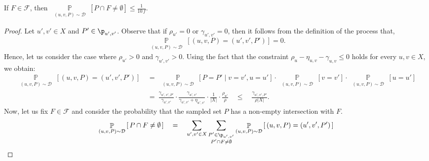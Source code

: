 \begin{lemma}\label{lem:probability_bounds_2}
    If $F\in \mathcal{F}$, then $\displaystyle \mathop{\mathbb{P}}\limits_{\substack{(u,v,P)\sim\mathcal{D}}}\left[P \cap F \neq \emptyset\right] \leq \frac{1}{10\,f}$.
\end{lemma}
\begin{proof}
    Let $u',v'\in X$ and $P'\in\p_{u',v'}$. Observe that if $\rho_{u'} = 0$ or $\gamma_{u',v'} = 0$, then it follows from the definition of the process that,
    $$
    \mathop{\mathbb{P}}\limits_{\substack{(u,v,P)\sim\mathcal{D}}}\left[(u,v,P) = (u',v',P')\right] = 0.
    $$
    Hence, let us consider the case where $\rho_{u'} > 0$ and $\gamma_{u',v'} > 0$. Using the fact that the constraint $\rho_u - \eta_{u,v} - \gamma_{u,v} \leq 0$ holds for every $u, v \in X$, we obtain:
    \begin{align*}
        \displaystyle \mathop{\mathbb{P}}\limits_{\substack{(u,v,P)\sim\mathcal{D}}}\left[(u,v,P) = (u',v',P')\right] \ 
        &= \ \displaystyle \mathop{\mathbb{P}}\limits_{\substack{(u,v,P)\sim\mathcal{D}}}\left[P = P' \mid v = v', u = u'\right] \cdot \mathop{\mathbb{P}}\limits_{\substack{(u,v,P)\sim\mathcal{D}}}\left[v = v'\right] \cdot \mathop{\mathbb{P}}\limits_{\substack{(u,v,P)\sim\mathcal{D}}}\left[u = u'\right] \\
        &= \ \frac{\gamma_{u',v',P'}}{\gamma_{u',v'}} \cdot \frac{\gamma_{u',v'}}{\gamma_{u',v'} + \eta_{u',v'}} \cdot \frac{1}{|X|} \cdot \frac{\rho_{u'}}{\rho} \quad 
        \leq \quad \frac{\gamma_{u',v',P'}}{\rho |X|}.
    \end{align*}
    Now, let us fix $F \in \mathcal{F}$ and consider the probability that the sampled set $P$ has a non-empty intersection with $F$.
    \begin{align*}
        \displaystyle \mathop{\mathbb{P}}\limits_{\substack{(u,v,P)\sim\mathcal{D}}}\left[\,P \cap F \neq \emptyset\,\right] \quad
        &= \quad \sum_{u',v'\in X} \sum_{\substack{P' \in \p_{u',v'} \\ P' \cap F \neq \emptyset}} 
        \displaystyle \mathop{\mathbb{P}}\limits_{\substack{(u,v,P)\sim\mathcal{D}}}\left[\, (u,v,P) = (u',v',P')\, \right] \\

\end{align*}
\end{proof}
